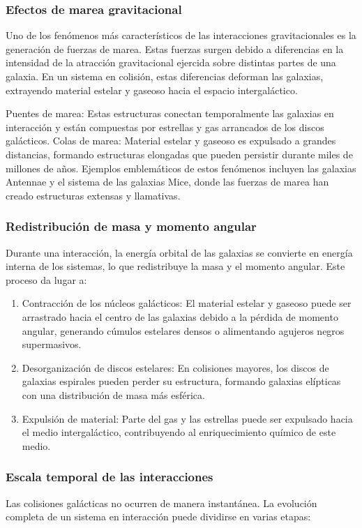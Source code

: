 \documentclass{article}
\begin{document}
\subsubsection{Efectos de marea gravitacional}
Uno de los fenómenos más característicos de las interacciones gravitacionales es la generación de fuerzas de marea. Estas fuerzas surgen debido a diferencias en la intensidad de la atracción gravitacional ejercida sobre distintas partes de una galaxia. En un sistema en colisión, estas diferencias deforman las galaxias, extrayendo material estelar y gaseoso hacia el espacio intergaláctico.

Puentes de marea: Estas estructuras conectan temporalmente las galaxias en interacción y están compuestas por estrellas y gas arrancados de los discos galácticos.
Colas de marea: Material estelar y gaseoso es expulsado a grandes distancias, formando estructuras elongadas que pueden persistir durante miles de millones de años.
Ejemplos emblemáticos de estos fenómenos incluyen las galaxias Antennae y el sistema de las galaxias Mice, donde las fuerzas de marea han creado estructuras extensas y llamativas.

\subsubsection{Redistribución de masa y momento angular}
Durante una interacción, la energía orbital de las galaxias se convierte en energía interna de los sistemas, lo que redistribuye la masa y el momento angular. Este proceso da lugar a:

\begin{enumerate}
    \item Contracción de los núcleos galácticos: El material estelar y gaseoso puede ser arrastrado hacia el centro de las galaxias debido a la pérdida de momento angular, generando cúmulos estelares densos o alimentando agujeros negros supermasivos.
    \item Desorganización de discos estelares: En colisiones mayores, los discos de galaxias espirales pueden perder su estructura, formando galaxias elípticas con una distribución de masa más esférica.
    \item Expulsión de material: Parte del gas y las estrellas puede ser expulsado hacia el medio intergaláctico, contribuyendo al enriquecimiento químico de este medio.
\end{enumerate}

\subsubsection{Escala temporal de las interacciones}
Las colisiones galácticas no ocurren de manera instantánea. La evolución completa de un sistema en interacción puede dividirse en varias etapas:
\end{document}
